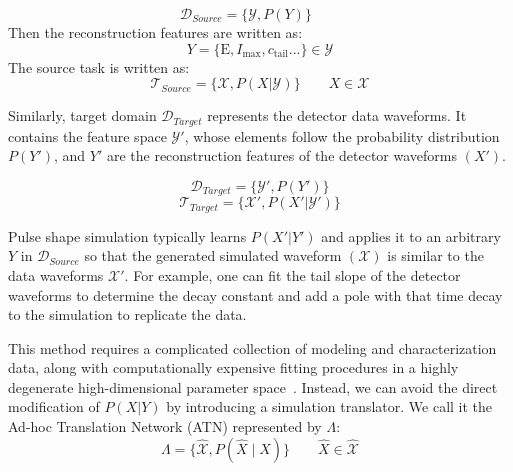 \begin{equation}
    \mathcal{D}_{Source}=\{\mathcal{Y},P(Y)\}\qquad 
    \label{eqn:source_domain}
\end{equation}
Then the reconstruction features are written as:
 \begin{equation}
     Y=\{\mathrm{E},I_{\mathrm{max}},c_{\mathrm{tail}}...\}\in \mathcal{Y}
 \end{equation}
The source task is written as:
\begin{equation}
    \mathcal{T}_{Source}=\{\mathcal{X},P(X|\mathcal{Y})\} \qquad X\in \mathcal{X}
    \label{eqn:source_task}
\end{equation}

Similarly, target domain $\mathcal{D}_{Target}$ represents the detector data waveforms. It contains the feature space $\mathcal{Y'}$, whose elements follow the probability distribution $P(Y')$, and $Y'$ are the reconstruction features of the detector waveforms $(X')$.

\begin{equation}
\mathcal{D}_{Target}=\{\mathcal{Y}',P(Y')\}
\end{equation}
\begin{equation}
\mathcal{T}_{Target}=\{\mathcal{X}',P(X'|\mathcal{Y}')\}
\end{equation}

Pulse shape simulation typically learns $P(X'|Y')$ and applies it to an arbitrary $Y$ in $\mathcal{D}_{Source}$ so that the generated simulated waveform $(\mathcal{X})$ is similar to the data waveforms $\mathcal{X}'$. For example, one can fit the tail slope of the detector waveforms to determine the decay constant and add a pole with that time decay to the simulation to replicate the data. 

This method requires a complicated collection of modeling and characterization data, along with computationally expensive fitting procedures in a highly degenerate high-dimensional parameter space~\cite{Ben_Thesis,Sam_Thesis}. Instead, we can avoid the direct modification of $P(X|Y)$ by introducing a simulation translator. We call it the Ad-hoc Translation Network (ATN) represented by $\Lambda$:
\begin{equation}
\Lambda = \{\hat{\mathcal{X}}, P(\hat{X}\mid X)\}\qquad \hat{X}\in \hat{\mathcal{X}}
\label{eqn:ATN}
\end{equation}

